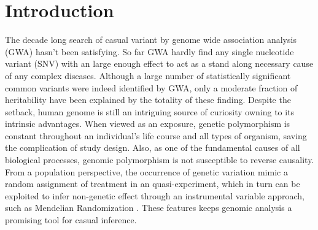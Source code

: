 \section{Introduction}
The decade long search of casual variant by genome wide association analysis (GWA) hasn't been satisfying. So far GWA hardly find any single nucleotide variant (SNV) with an large enough effect to act as a stand along necessary cause of any complex diseases. Although a large number of statistically significant common variants were indeed identified by GWA, only a moderate fraction of heritability have been explained by the totality of these finding\cite{GWA1, GWA2}. Despite the setback, human genome is still an intriguing source of curiosity owning to its intrinsic advantages. When viewed as an exposure, genetic polymorphism is constant throughout an individual's life course and all types of organism, saving the complication of study design. Also, as one of the fundamental causes of all biological processes, genomic polymorphism is not susceptible to reverse causality. From a population perspective, the occurrence of genetic variation mimic a random assignment of treatment in an quasi-experiment, which in turn can be exploited to infer non-genetic effect through an instrumental variable approach, such as Mendelian Randomization \cite{MR1, MR2}. These features keeps genomic analysis a promising tool for casual inference.

